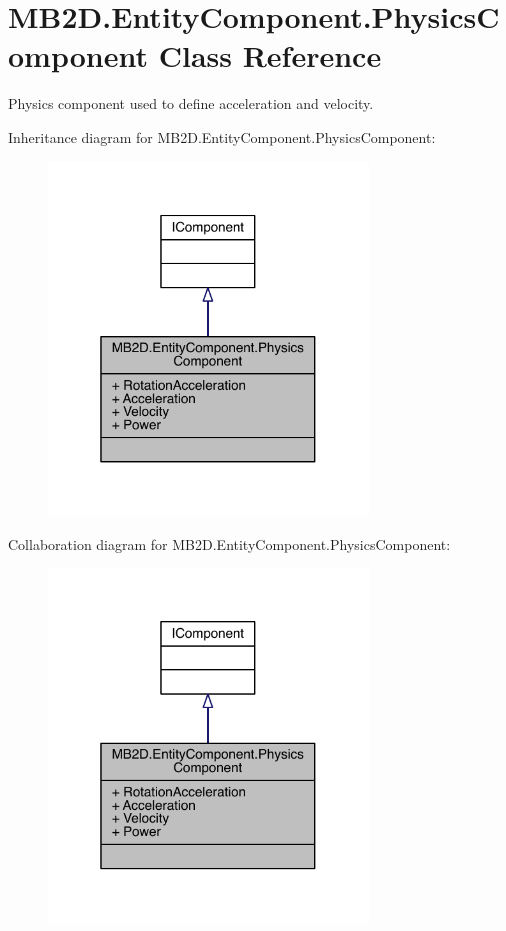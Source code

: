 \hypertarget{class_m_b2_d_1_1_entity_component_1_1_physics_component}{}\section{M\+B2\+D.\+Entity\+Component.\+Physics\+Component Class Reference}
\label{class_m_b2_d_1_1_entity_component_1_1_physics_component}


Physics component used to define acceleration and velocity.  




Inheritance diagram for M\+B2\+D.\+Entity\+Component.\+Physics\+Component\+:
\nopagebreak
\begin{figure}[H]
\begin{center}
\leavevmode
\includegraphics[width=241pt]{class_m_b2_d_1_1_entity_component_1_1_physics_component__inherit__graph}
\end{center}
\end{figure}


Collaboration diagram for M\+B2\+D.\+Entity\+Component.\+Physics\+Component\+:
\nopagebreak
\begin{figure}[H]
\begin{center}
\leavevmode
\includegraphics[width=241pt]{class_m_b2_d_1_1_entity_component_1_1_physics_component__coll__graph}
\end{center}
\end{figure}
